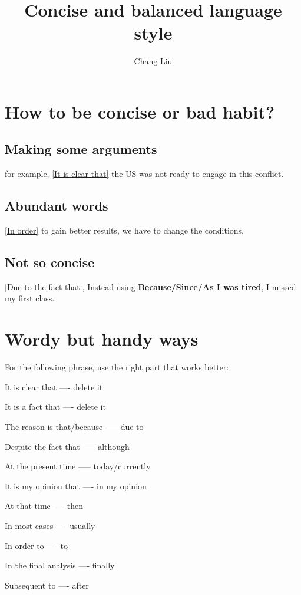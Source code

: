 \documentclass{article}
\author{Chang Liu}
\title{Concise and balanced language style}
\begin{document}
\maketitle


\section{How to be concise or bad habit?}

\subsection{Making some arguments}
for example, \underline{[It is clear that]} the US was not ready to engage in this conflict.

\subsection{Abundant words}
\underline{[In order]} to gain better results, we have to change the conditions.

\subsection{Not so concise}
\underline{[Due to the fact that]}, Instead using \textbf{Because/Since/As I was tired}, I missed my first class.

\section{Wordy but handy ways}

For the following phrase, use the right part that works better:

It is clear that		----  		delete it

It is a fact that 		----		delete it

The reason is that/because 		-----	due to

Despite the fact that			-----	although

At the present time				-----	today/currently

It is my opinion that			---- 	in my opinion

At that time					---- 	then

In most cases					---- 	usually

In order to						----	to

In the final analysis			----	finally

Subsequent to					----	after
\end{document}
